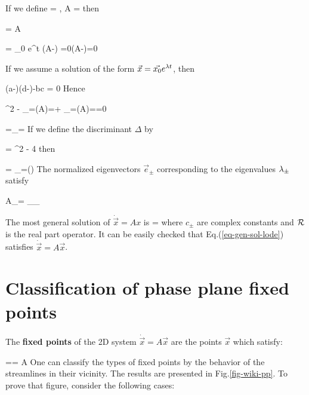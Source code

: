 If we define
\beq
{} = \left[ 
\begin{array}{c}
x\\y
\end{array}
\right]
\;,\;\;
A = \left[
\begin{array}{cc}
a & b
\\
c & d
\end{array}
\right]
\eeq
then

\beq
{} = A 
\eeq

\beq 
{}= _0 e^{\lam t}
\implies 
(A-\lam)  =0\implies \det(A-\lam)=0
\eeq

If we assume a solution of the form $\vec{x}=\vec{x_0}
e^{\lambda t}$, then

\beq
 (a-\lam)(d-\lam)-bc = 0
\eeq
Hence

\beq
\lam^2 - 
_{=\tr(A)=\tau}\lam + 
_{=\det(A)=\delta}=0
\eeq

\beq
\lam =\lam_{\pm}=
\eeq
If we define the discriminant $\Delta$ by

\beq
\Delta = \tau^2 - 4 \delta
\eeq
then

\beq
\lam = \lam_\pm =(\tau\pm \sqrt{\Delta})
\eeq
The normalized eigenvectors $\vec{e}_\pm$ corresponding
to the eigenvalues $\lambda_\pm$ satisfy

\beq 
A_\pm = \lam_{\pm}_\pm
\eeq


The most general solution 
of $\dot{\vec{x}}=A x$ is
\beq
{} = \calr{}
\label{eq-gen-sol-lode}
\eeq
where $c_\pm$ are complex constants and ${\cal R}$
is the real part operator. It can be easily checked that
Eq.(\ref{eq-gen-sol-lode}) satisfies $\dot{\vec{x}} = A \vec{x}$.

\section{Classification of phase plane fixed points}

The {\bf fixed points} of the 2D system $\dot{\vec{x}}=A\vec{x}$ are 
the points $\vec{x}$ which satisfy:

== A
\eeq
One can classify the types of fixed points by the behavior
of the streamlines in their vicinity.
The results are 
presented in Fig.\ref{fig-wiki-pp}.
To prove that figure, consider the following cases:


